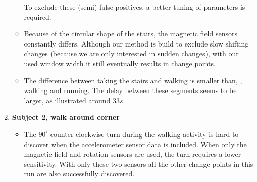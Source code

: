 \begin{enumerate}
\begin{itemize}
      To exclude these (semi) false positives, a better tuning of parameters is required.
      \item Because of the circular shape of the stairs, the magnetic field sensors constantly differs.
      Although our method is build to exclude slow shifting changes (because we are only interested in sudden changes), with our used window width it still eventually results in change points.
      \item The difference between taking the stairs and walking is smaller than, \eg, walking and running.
      The delay between these segments seems to be larger, as illustrated around $33s$.
    \end{itemize}
  \item \textbf{Subject 2, walk around corner} 
    \begin{itemize}
      \item The $90^{\circ}$ counter-clockwise turn during the walking activity is hard to discover when the accelerometer sensor data is included.
      When only the magnetic field and rotation sensors are used, the turn requires a lower sensitivity.
      With only these two sensors all the other change points in this run are also successfully discovered.
    \end{itemize}
\end{enumerate}

